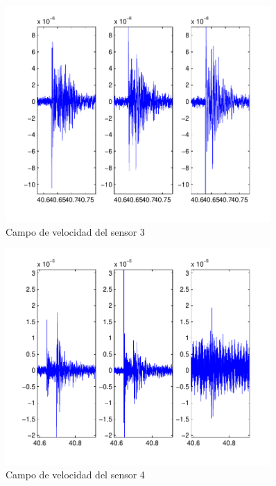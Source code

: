 \begin{figure}[H]
\includegraphics[width=0.9\textwidth,height=0.4\textheight]{linea_timerev/figuras/plotSensor(Ev(1),3).pdf}
\caption{Campo de velocidad del sensor 3}
\end{figure}
\begin{figure}[H]
\includegraphics[width=0.9\textwidth,height=0.4\textheight]{linea_timerev/figuras/plotSensor(Ev(1),4).pdf}
\caption{Campo de velocidad del sensor 4}
\end{figure}
